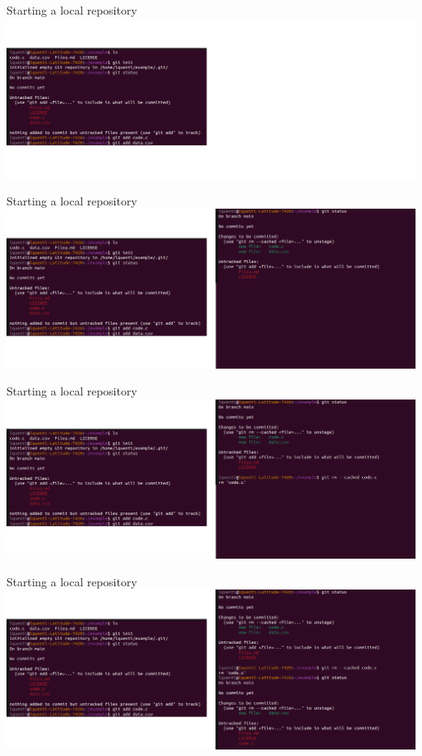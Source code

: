 \documentclass[compress,aspectratio=169]{beamer}
\begin{document}
  \begin{frame}[noframenumbering]{Starting a local repository}
    \includegraphics[width=\textwidth]{./assets/terminal_slideshows/01_add_existing_repo_05.png}
  \end{frame}
  \begin{frame}[noframenumbering]{Starting a local repository}
    \includegraphics[width=\textwidth]{./assets/terminal_slideshows/01_add_existing_repo_06.png}
  \end{frame}
  \begin{frame}[noframenumbering]{Starting a local repository}
    \includegraphics[width=\textwidth]{./assets/terminal_slideshows/01_add_existing_repo_07.png}
  \end{frame}
  \begin{frame}[noframenumbering]{Starting a local repository}
    \includegraphics[width=\textwidth]{./assets/terminal_slideshows/01_add_existing_repo_08.png}
  \end{frame}
\end{document}
